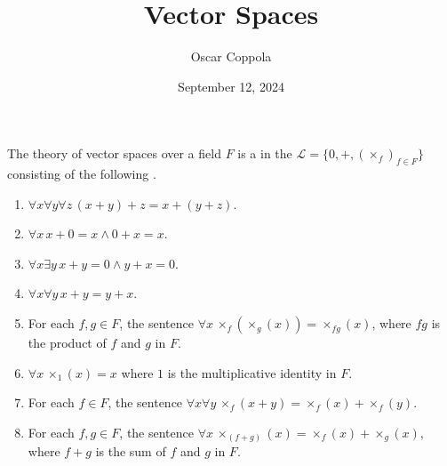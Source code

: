\documentclass[a4paper]{article}
\title{Vector Spaces}
\date{September 12, 2024}
\author{Oscar Coppola}
\begin{document}
\maketitle
\par{
    The theory of vector spaces over a field \(F\) is a  in the  \(\mathcal  L= \{ 0,+,( \times _f)_{f \in  F} \}\)
    consisting of the following .
    \begin{enumerate}
\item{\(\forall  x \forall  y \forall  z \, (x+y)+z=x+(y+z)\).
        }
        \item{\(\forall  x \, x+0=x \land0 +x=x\).
        }
        \item{\(\forall  x \exists  y \, x+y=0 \land  y+x=0\).
        }
        \item{\(\forall  x \forall  y \, x+y=y+x\).
        }
        \item{
            For each \(f,g \in  F\), the sentence \(\forall  x \, \times _f( \times _g(x)) =  \times _{fg}(x)\), where \(fg\) is the product of \(f\) and \(g\) in \(F\).
        }
        \item{\(\forall  x \, \times _1(x) = x\) where \(1\) is the multiplicative identity in \(F\).
        }
        \item{
            For each \(f \in  F\), the sentence \(\forall  x \forall  y \, \times _f(x+y) =  \times _f(x)+ \times _f(y)\).
        }
        \item{
            For each \(f,g \in  F\), the sentence \(\forall  x \, \times _(f+g)(x) =  \times _f(x)+ \times _g(x)\), where \(f+g\) is the sum of \(f\) and \(g\) in \(F\).
        }
\end{enumerate}}
\printbibliography
\end{document}
